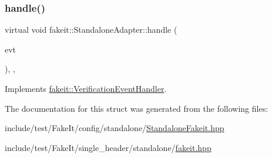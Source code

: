 \subsubsection{\texorpdfstring{handle()}{handle()}\hspace{0.1cm}{\footnotesize\ttfamily [6/6]}}
{\footnotesize\ttfamily virtual void fakeit\+::\+Standalone\+Adapter\+::handle (\begin{DoxyParamCaption}\item[{const \mbox{\hyperlink{structfakeit_1_1NoMoreInvocationsVerificationEvent}{No\+More\+Invocations\+Verification\+Event}} \&}]{evt }\end{DoxyParamCaption})\hspace{0.3cm}{\ttfamily [inline]}, {\ttfamily [override]}, {\ttfamily [virtual]}}



Implements \mbox{\hyperlink{structfakeit_1_1VerificationEventHandler_a826b9d15e23bad7013b219d8e45ef1d0}{fakeit\+::\+Verification\+Event\+Handler}}.



The documentation for this struct was generated from the following files\+:\begin{DoxyCompactItemize}
\item 
include/test/\+Fake\+It/config/standalone/\mbox{\hyperlink{StandaloneFakeit_8hpp}{Standalone\+Fakeit.\+hpp}}\item 
include/test/\+Fake\+It/single\+\_\+header/standalone/\mbox{\hyperlink{single__header_2standalone_2fakeit_8hpp}{fakeit.\+hpp}}\end{DoxyCompactItemize}
